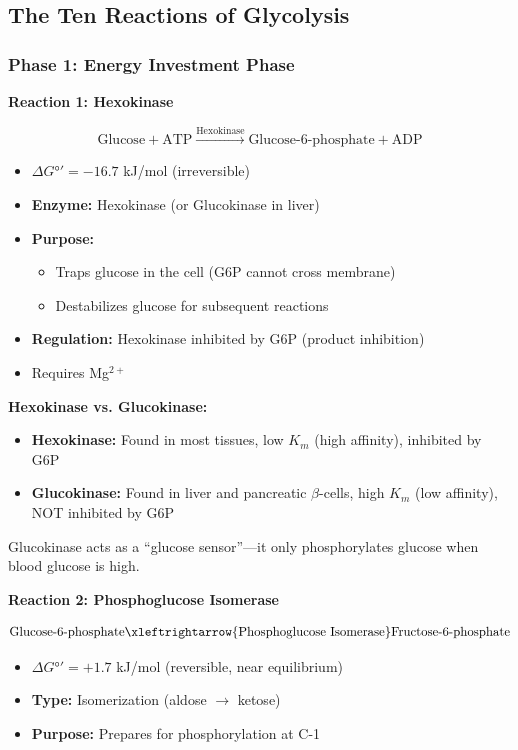 \subsection{The Ten Reactions of Glycolysis}

\subsubsection{Phase 1: Energy Investment Phase}

\textbf{Reaction 1: Hexokinase}

\[
\text{Glucose} + \text{ATP} \xrightarrow{\text{Hexokinase}} \text{Glucose-6-phosphate} + \text{ADP}
\]

\begin{itemize}
    \item $\Delta G°' = -16.7$ kJ/mol (irreversible)
    \item \textbf{Enzyme:} Hexokinase (or Glucokinase in liver)
    \item \textbf{Purpose:} 
    \begin{itemize}
        \item Traps glucose in the cell (G6P cannot cross membrane)
        \item Destabilizes glucose for subsequent reactions
    \end{itemize}
    \item \textbf{Regulation:} Hexokinase inhibited by G6P (product inhibition)
    \item Requires Mg$^{2+}$
\end{itemize}

\begin{definition}
\textbf{Hexokinase vs. Glucokinase:}
\begin{itemize}
    \item \textbf{Hexokinase:} Found in most tissues, low $K_m$ (high affinity), inhibited by G6P
    \item \textbf{Glucokinase:} Found in liver and pancreatic $\beta$-cells, high $K_m$ (low affinity), NOT inhibited by G6P
\end{itemize}
Glucokinase acts as a ``glucose sensor''—it only phosphorylates glucose when blood glucose is high.
\end{definition}

\textbf{Reaction 2: Phosphoglucose Isomerase}

\[
\text{Glucose-6-phosphate} \xleftrightarrow{\text{Phosphoglucose Isomerase}} \text{Fructose-6-phosphate}
\]

\begin{itemize}
    \item $\Delta G°' = +1.7$ kJ/mol (reversible, near equilibrium)
    \item \textbf{Type:} Isomerization (aldose $\rightarrow$ ketose)
    \item \textbf{Purpose:} Prepares for phosphorylation at C-1
\end{itemize}

